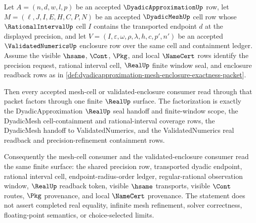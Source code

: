 \begin{theorem}
\label{thm:dyadicapproximation-finite-mesh-enclosure-exactness}
Let $A=(n,d,w,l,p)$ be an accepted $\DyadicApproximationUp$ row, let
$M=(\ell,J,I,E,H,C,P,N)$ be an accepted $\DyadicMeshUp$ cell row whose
$\RationalIntervalUp$ cell $I$ contains the transported endpoint $d$ at the
displayed precision, and let
$V=(I,\varepsilon,\omega,\rho,\lambda,h,c,p',n')$ be an accepted
$\ValidatedNumericsUp$ enclosure row over the same cell and containment ledger.
Assume the visible $\hsame$, $\Cont$, $\Pkg$, and local $\NameCert$ rows
identify the precision request, rational interval cell, $\RealUp$ finite
window seal, and enclosure readback rows as in
\autoref{def:dyadicapproximation-mesh-enclosure-exactness-packet}.

Then every accepted mesh-cell or validated-enclosure consumer read through
that packet factors through one finite $\RealUp$ surface. The factorization is
exactly the DyadicApproximation $\RealUp$ seal handoff and finite-window
scope, the DyadicMesh cell-containment and rational-interval coverage rows,
the DyadicMesh handoff to ValidatedNumerics, and the ValidatedNumerics real
readback and precision-refinement containment rows.

Consequently the mesh-cell consumer and the validated-enclosure consumer read
the same finite surface: the shared precision row, transported dyadic endpoint,
rational interval cell, endpoint-radius-order ledger, regular-rational
observation window, $\RealUp$ readback token, visible $\hsame$ transports,
visible $\Cont$ routes, $\Pkg$ provenance, and local $\NameCert$ provenance.
The statement does not assert completed real equality, infinite mesh
refinement, solver correctness, floating-point semantics, or choice-selected
limits.
\end{theorem}

